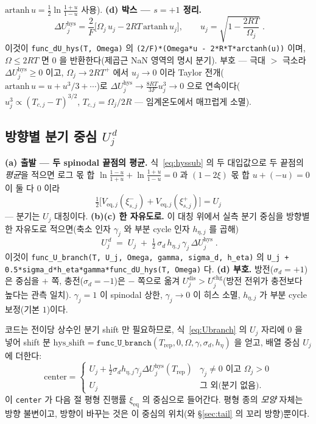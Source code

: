 \documentclass[11pt,a4paper]{article}
\newcommand{\eq}{\mathrm{eq}}
\newcommand{\dis}{\mathrm{dis}}
\newcommand{\chg}{\mathrm{chg}}
\newcommand{\hys}{\mathrm{hys}}
\newcommand{\rep}{\mathrm{rep}}
\newcommand{\code}[1]{\texttt{#1}}
\begin{document}
$\mathrm{artanh}\,u=\tfrac12\ln\tfrac{1+u}{1-u}$ 사용). \textbf{(d) 박스 — $s=+1$ 정리.}
\begin{equation}
\boxed{\;\Delta U_j^\hys
=\frac{2}{F}\Big[\Omega_j\,u_j-2RT\,\mathrm{artanh}\,u_j\Big],
\qquad u_j=\sqrt{1-\frac{2RT}{\Omega_j}}\;.}
\label{eq:dUhys}
\end{equation}
이것이 \code{func\_dU\_hys(T, Omega)} 의 \code{(2/F)*(Omega*u - 2*R*T*arctanh(u))} 이며, $\Omega\le2RT$ 면 $0$ 을
반환한다(제곱근 NaN 영역의 명시 분기). 부호 — 극대 $>$ 극소라 $\Delta U_j^\hys\ge0$ 이고, $\Omega_j\to2RT^+$ 에서
$u_j\to0$ 이라 Taylor 전개($\mathrm{artanh}\,u=u+u^3/3+\cdots$)로 $\Delta U_j^\hys\to\frac{8RT}{3F}u_j^3\to0$ 으로
연속이다($u_j^3\propto(T_{c,j}-T)^{3/2}$, $T_{c,j}=\Omega_j/2R$ — 임계온도에서 매끄럽게 소멸).

\subsection{방향별 분기 중심 $U_j^{\,d}$}
\textbf{(a) 출발 — 두 spinodal 끝점의 평균.} 식~\eqref{eq:hyssub} 의 두 대입값으로 두 끝점의 \emph{평균}을 적으면
로그 몫 합 $\ln\frac{1-u}{1+u}+\ln\frac{1+u}{1-u}=0$ 과 $(1-2\xi)$ 몫 합 $u+(-u)=0$ 이 둘 다 $0$ 이라
\begin{equation}
\tfrac12\big[V_{\eq,j}(\xi_{s,j}^-)+V_{\eq,j}(\xi_{s,j}^+)\big]=U_j
\label{eq:hyssym}
\end{equation}
— 분기는 $U_j$ 대칭이다. \textbf{(b)(c) 한 자유도로.} 이 대칭 위에서 실측 분기 중심을 방향별 한 자유도로 적으면(축소
인자 $\gamma_j$ 와 부분 cycle 인자 $h_{\eta,j}$ 를 곱해)
\begin{equation}
\boxed{\;U_j^{\,d}\;=\;U_j\;+\;\tfrac12\,\sigma_d\,h_{\eta,j}\,\gamma_j\,\Delta U_j^\hys\;.}
\label{eq:Ubranch}
\end{equation}
이것이 \code{func\_U\_branch(T, U\_j, Omega, gamma, sigma\_d, h\_eta)} 의
\code{U\_j + 0.5*sigma\_d*h\_eta*gamma*func\_dU\_hys(T, Omega)} 다. \textbf{(d) 부호.} 방전($\sigma_d=+1$)은 중심을
$+$ 쪽, 충전($\sigma_d=-1$)은 $-$ 쪽으로 옮겨 $U_j^{\dis}>U_j^{\chg}$(방전 전위가 충전보다 높다는 관측 일치).
$\gamma_j=1$ 이 spinodal 상한, $\gamma_j\to0$ 이 히스 소멸, $h_{\eta,j}$ 가 부분 cycle 보정(기본 $1$)이다.

코드는 전이당 상수인 분기 shift 만 필요하므로, 식~\eqref{eq:Ubranch} 의 $U_j$ 자리에 $0$ 을 넣어 shift 분
$\mathrm{hys\_shift}=\code{func\_U\_branch}(T_\rep,0,\Omega,\gamma,\sigma_d,h_\eta)$ 을 얻고, 배열 중심 $U_j$ 에 더한다:
\begin{equation}
\mathrm{center}=
\begin{cases}
U_j+\tfrac12\sigma_d h_{\eta,j}\gamma_j\Delta U_j^\hys(T_\rep) & \gamma_j\ne0 \text{ 이고 } \Omega_j>0\\[2pt]
U_j & \text{그 외(분기 없음)}.
\end{cases}
\label{eq:center}
\end{equation}
이 \code{center} 가 다음 절 평형 진행률 $\xi_\eq$ 의 중심으로 들어간다. 평형 종의 \emph{모양} 자체는 방향 불변이고,
방향이 바꾸는 것은 이 중심의 위치(와 \S\ref{sec:tail} 의 꼬리 방향)뿐이다.
\end{document}

